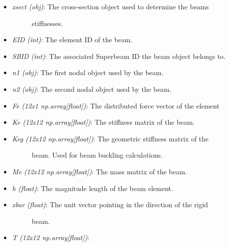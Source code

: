 \documentclass[letterpaper,10pt,english]{sphinxmanual}
\begin{document}
\begin{fulllineitems}
\begin{itemize}
\begin{description}
\end{description}

\item {} \begin{description}
\item[{\emph{xsect (obj)}: The cross-section object used to determine the beams}] \leavevmode
stiffnesses.

\end{description}

\item {} 
\emph{EID (int)}: The element ID of the beam.

\item {} 
\emph{SBID (int)}: The associated Superbeam ID the beam object belongs to.

\item {} 
\emph{n1 (obj)}: The first nodal object used by the beam.

\item {} 
\emph{n2 (obj)}: The second nodal object used by the beam.

\item {} 
\emph{Fe (12x1 np.array{[}float{]})}: The distributed force vector of the element

\item {} 
\emph{Ke (12x12 np.array{[}float{]})}: The stiffness matrix of the beam.

\item {} \begin{description}
\item[{\emph{Keg (12x12 np.array{[}float{]})}: The geometric stiffness matrix of the}] \leavevmode
beam. Used for beam buckling calculations.

\end{description}

\item {} 
\emph{Me (12x12 np.array{[}float{]})}: The mass matrix of the beam.

\item {} 
\emph{h (float)}: The magnitude length of the beam element.

\item {} \begin{description}
\item[{\emph{xbar (float)}: The unit vector pointing in the direction of the rigid}] \leavevmode
beam.

\end{description}

\item {} 
\emph{T (12x12 np.array{[}float{]})}:


\end{itemize}
\end{fulllineitems}
\end{document}

